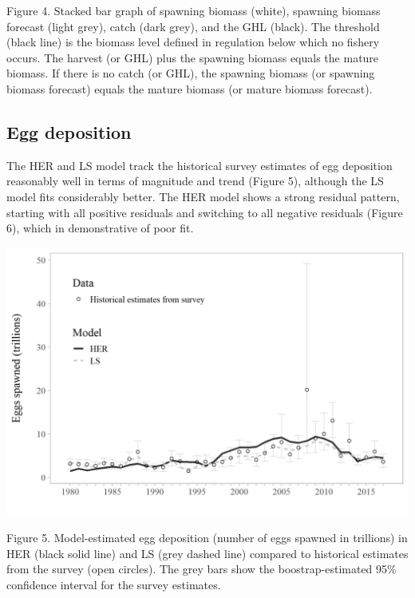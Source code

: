 \documentclass[]{article}
\begin{document}
Figure 4. Stacked bar graph of spawning biomass (white), spawning
biomass forecast (light grey), catch (dark grey), and the GHL (black).
The threshold (black line) is the biomass level defined in regulation
below which no fishery occurs. The harvest (or GHL) plus the spawning
biomass equals the mature biomass. If there is no catch (or GHL), the
spawning biomass (or spawning biomass forecast) equals the mature
biomass (or mature biomass forecast).

\subsection{Egg deposition}\label{egg-deposition}

The HER and LS model track the historical survey estimates of egg
deposition reasonably well in terms of magnitude and trend (Figure 5),
although the LS model fits considerably better. The HER model shows a
strong residual pattern, starting with all positive residuals and
switching to all negative residuals (Figure 6), which in demonstrative
of poor fit.

\includegraphics[width=1\linewidth]{../../HER/figs/compare_eggdep_plot}

Figure 5. Model-estimated egg deposition (number of eggs spawned in
trillions) in HER (black solid line) and LS (grey dashed line) compared
to historical estimates from the survey (open circles). The grey bars
show the boostrap-estimated 95\% confidence interval for the survey
estimates.
\end{document}
